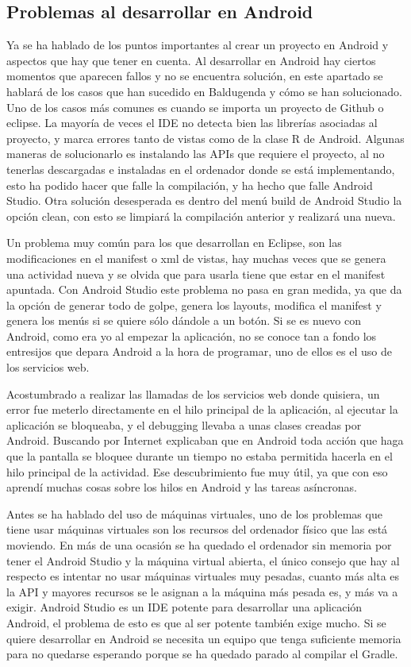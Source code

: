 \subsection{Problemas al desarrollar en Android}
\label{subsecc:Problemas al desarrollar en Android}

Ya se ha hablado de los puntos importantes al crear un proyecto en Android y aspectos que hay que tener en cuenta.
Al desarrollar en Android hay ciertos momentos que aparecen fallos y no se encuentra solución, en este apartado se hablará de los casos que han sucedido en Baldugenda y cómo se han solucionado.
Uno de los casos más comunes es cuando se importa un proyecto de Github o eclipse. La mayoría de veces el IDE no detecta bien las librerías asociadas al proyecto, y marca errores tanto de vistas como de la clase R de Android.
Algunas maneras de solucionarlo es instalando las APIs que requiere el proyecto, al no tenerlas descargadas e instaladas en el ordenador donde se está implementando, esto ha podido hacer que falle la compilación, y ha hecho que falle Android Studio.
Otra solución desesperada es dentro del menú build de Android Studio la opción clean, con esto se limpiará la compilación anterior y realizará una nueva.

Un problema muy común para los que desarrollan en Eclipse, son las modificaciones en el manifest o xml de vistas, hay muchas veces que se genera una actividad nueva y se olvida que para usarla tiene que estar en el manifest apuntada.
Con Android Studio este problema no pasa en gran medida, ya que da la opción de generar todo de golpe, genera los layouts, modifica el manifest y genera los menús si se quiere sólo dándole a un botón.
Si se es nuevo con Android, como era yo al empezar la aplicación, no se conoce tan a fondo los entresijos  que depara Android a la hora de programar, uno de ellos es el uso de los servicios web.

Acostumbrado a realizar las llamadas de los servicios web donde quisiera, un error fue meterlo directamente en el hilo principal de la aplicación, al ejecutar la aplicación se bloqueaba, y el debugging llevaba a unas clases creadas por Android.
Buscando por Internet explicaban que en Android toda acción que haga que la pantalla se bloquee durante un tiempo no estaba permitida hacerla en el hilo principal de la actividad.
Ese descubrimiento fue muy útil, ya que con eso aprendí  muchas cosas sobre los hilos en Android y las tareas asíncronas.

Antes se ha hablado del uso de máquinas virtuales, uno de los problemas que tiene usar máquinas virtuales son los recursos del ordenador físico que las está moviendo. En más de una ocasión se ha quedado el ordenador sin memoria por tener el Android Studio y la máquina virtual abierta, el único consejo que hay al respecto es intentar no usar máquinas virtuales muy pesadas, cuanto más alta es la API y mayores recursos se le asignan a la máquina más pesada es, y más va a exigir.
Android Studio es un IDE potente para desarrollar una aplicación Android, el problema de esto es que al ser potente también exige mucho. Si se quiere desarrollar en Android se necesita un equipo que tenga suficiente memoria para no quedarse esperando porque se ha quedado parado al compilar el Gradle.

